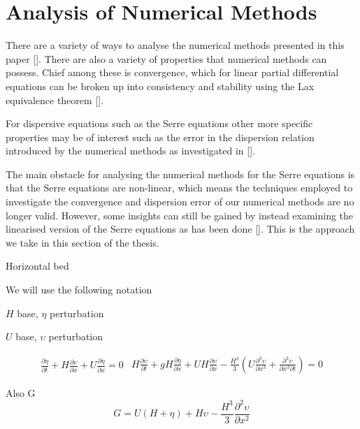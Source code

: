 
\chapter{Analysis of Numerical Methods}
\label{chp:AnalNumMethod}
There are a variety of ways to analyse the numerical methods presented in this paper []. There are also a variety of properties that numerical methods can possess. Chief among these is convergence, which for linear partial differential equations can be broken up into consistency and stability using the Lax equivalence theorem []. 


For dispersive equations such as the Serre equations other more specific properties may be of interest such as the error in the dispersion relation introduced by the numerical methods as investigated in []. 

The main obstacle for analysing the numerical methods for the Serre equations is that the Serre equations are non-linear, which means the techniques employed to investigate the convergence and dispersion error of our numerical methods are no longer valid. However, some insights can still be gained by instead examining the linearised version of the Serre equations as has been done []. This is the approach we take in this section of the thesis.

Horizontal bed

We will use the following notation 

$H$ base, $\eta$ perturbation

$U$ base, $\upsilon$ perturbation

\begin{subequations}
	\begin{gather}
		\label{eqn:LinCont}
		\frac{\partial  \eta}{\partial  t} + H\frac{\partial  \upsilon}{\partial  x} + U\frac{\partial  \eta}{\partial  x} = 0
	\end{gather}
	
	\begin{gather}
	\label{eqn:LineMome}
	H\frac{\partial  \upsilon}{\partial  t} + gH\frac{\partial  \eta}{\partial  x} + UH\frac{\partial  \upsilon}{\partial  x} - \frac{H^3}{3}\left(U\frac{\partial^3  \upsilon}{\partial  x^3} + \frac{\partial^3  \upsilon}{\partial  x^3 \partial  t}  \right)  = 0
	\end{gather}
\label{eqn:LinSerre}	
\end{subequations}

Also G
\begin{equation}
	G = U\left(H + \eta\right) + H\upsilon -\frac{H^3}{3} \frac{\partial^2 \upsilon}{\partial x^2}
	\label{eqn:LinConSerreG}	
\end{equation}

